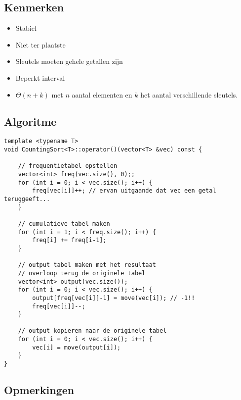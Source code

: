 \documentclass[a4paper]{article}
\begin{document}
\subsection*{Kenmerken}
\begin{itemize}
	\item Stabiel
	\item Niet ter plaatste
	\item Sleutels moeten gehele getallen zijn
	\item Beperkt interval
	\item $\Theta(n+k)$ met $n$ aantal elementen en $k$ het aantal verschillende sleutels.
\end{itemize}

\subsection*{Algoritme}
\begin{lstlisting}
template <typename T>
void CountingSort<T>::operator()(vector<T> &vec) const {

	// frequentietabel opstellen
	vector<int> freq(vec.size(), 0);;
	for (int i = 0; i < vec.size(); i++) {
		freq[vec[i]]++; // ervan uitgaande dat vec een getal teruggeeft...
	}

	// cumulatieve tabel maken
	for (int i = 1; i < freq.size(); i++) {
		freq[i] += freq[i-1];
	}
	
	// output tabel maken met het resultaat
	// overloop terug de originele tabel
	vector<int> output(vec.size());
	for (int i = 0; i < vec.size(); i++) {
		output[freq[vec[i]]-1] = move(vec[i]); // -1!!
		freq[vec[i]]--;
	}

	// output kopieren naar de originele tabel
	for (int i = 0; i < vec.size(); i++) {
		vec[i] = move(output[i]);
	}
}
\end{lstlisting}

\subsection*{Opmerkingen}
\newpage
\end{document}
